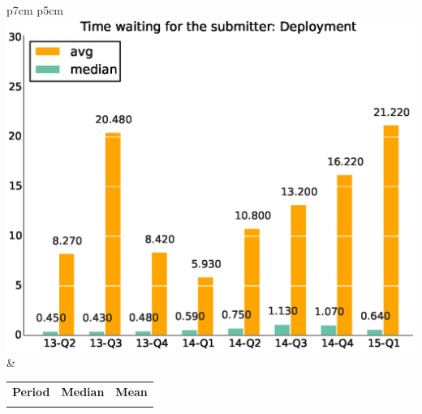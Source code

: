 \documentclass[a4wide,11pt]{article}
\begin{document}
\begin{tabular}{p{7cm} p{5cm}}
    \vspace{0pt} 
    \includegraphics[scale=.35]{figs/waiting4submitter_avgDeployment.eps}
    & 
    \vspace{0pt}
    \begin{tabular}{l|r|r|}%
    \bfseries Period & \bfseries Median & \bfseries Mean %
    \csvreader[head to column names]{data/timewaiting4submitter_medianDeployment.csv}{}%
    {\\ & \mediantime & \meantime}
    \end{tabular}
\end{tabular}
\end{document}
